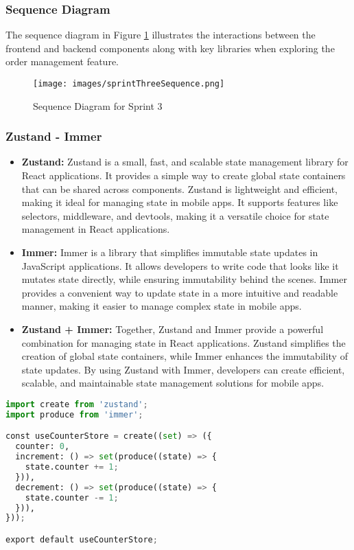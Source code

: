 \subsubsection{Sequence Diagram}

The sequence diagram in Figure \ref{fig:sequence_sprint3} illustrates the interactions between the frontend and backend components along with key libraries when exploring the order management feature.

\begin{figure}[H]
    \centering
    \texttt{[image: images/sprintThreeSequence.png]}
    \caption{Sequence Diagram for Sprint 3}
    \label{fig:sequence_sprint3}
\end{figure}

\subsubsection{Zustand - Immer}

\begin{itemize}
    \item \textbf{Zustand:} Zustand is a small, fast, and scalable state management library for React applications. It provides a simple way to create global state containers that can be shared across components. Zustand is lightweight and efficient, making it ideal for managing state in mobile apps. It supports features like selectors, middleware, and devtools, making it a versatile choice for state management in React applications.
    \item \textbf{Immer:} Immer is a library that simplifies immutable state updates in JavaScript applications. It allows developers to write code that looks like it mutates state directly, while ensuring immutability behind the scenes. Immer provides a convenient way to update state in a more intuitive and readable manner, making it easier to manage complex state in mobile apps.
    \item \textbf{Zustand + Immer:} Together, Zustand and Immer provide a powerful combination for managing state in React applications. Zustand simplifies the creation of global state containers, while Immer enhances the immutability of state updates. By using Zustand with Immer, developers can create efficient, scalable, and maintainable state management solutions for mobile apps.
\end{itemize}

\begin{lstlisting}[language=Python, caption=Zustand + Immer Example, frame=single, framerule=0.5pt]
import create from 'zustand';
import produce from 'immer';

const useCounterStore = create((set) => ({
  counter: 0,
  increment: () => set(produce((state) => {
    state.counter += 1;
  })),
  decrement: () => set(produce((state) => {
    state.counter -= 1;
  })),
}));

export default useCounterStore;
\end{lstlisting}

